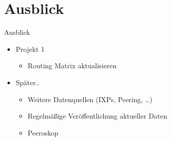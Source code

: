 \documentclass[ngerman,compress,hyperref={bookmarks}]{beamer}
\begin{document}
\section{Ausblick}
\begin{frame}{Ausblick}
  \begin{itemize}
    \item Projekt 1
    \begin{itemize}
      \item Routing Matrix aktualisieren
    \end{itemize}
    \item Später..
    \begin{itemize}
      \item Weitere Datenquellen (IXPs, Peering, \ldots)
      \item Regelmäßige Veröffentlichung aktueller Daten
      \item Peeroskop
    \end{itemize}
  \end{itemize}
\end{frame}
\end{document}
